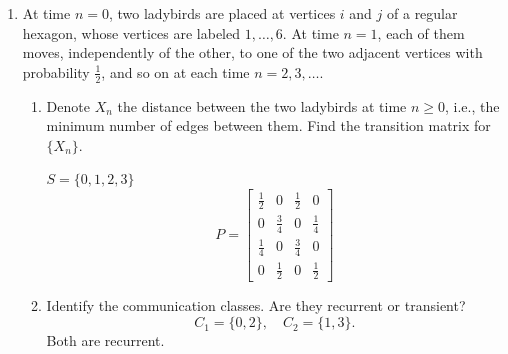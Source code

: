 \documentclass[10pt, oneside]{article}
\theoremstyle{definition}
\begin{document}
\begin{enumerate}
    \item At time $n = 0$, two ladybirds are placed at vertices $i$ and $j$ of a regular hexagon, whose vertices are labeled $1, \dots, 6$. At time $n = 1$, each of them moves, independently of the other, to one of the two adjacent vertices with probability $\frac{1}{2}$, and so on at each time $n = 2, 3, \dots$.
    \begin{enumerate}
        \item Denote $X_n$ the distance between the two ladybirds at time $n \geq 0$, i.e., the minimum number of edges between them. Find the transition matrix for $\{X_n\}$.
        \begin{solution}
            $S = \{0, 1, 2, 3\}$
            \[P = \begin{bmatrix}
                \frac{1}{2} & 0 & \frac{1}{2} & 0\\
                0 & \frac{3}{4} & 0 & \frac{1}{4}\\
                \frac{1}{4}& 0 & \frac{3}{4} & 0\\
                0 & \frac{1}{2} & 0 & \frac{1}{2}
            \end{bmatrix}\]
        \end{solution}
        \item Identify the communication classes. Are they recurrent or transient?
        \[C_1 = \{0,2\}, \quad C_2 = \{1,3\}.\] Both are recurrent.
    \end{enumerate}


\end{enumerate}
\end{document}
